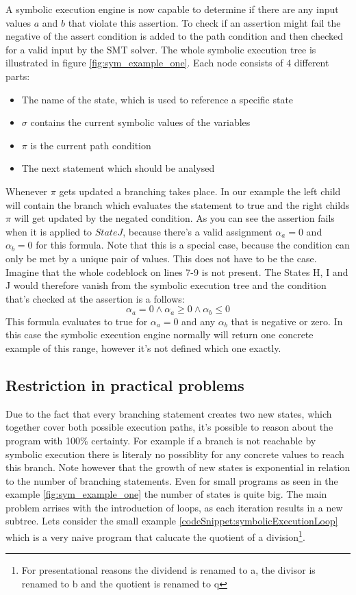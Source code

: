 A symbolic execution engine is now capable to determine if there are any input values $a$  and $b$ that violate this assertion. To check if an assertion might fail the negative of the assert condition is added to the path condition and then checked for a valid input by the SMT solver. The whole symbolic execution tree is illustrated in figure \ref{fig:sym_example_one}. Each node consists of 4 different parts:
\begin{itemize}
\item The name of the state, which is used to reference a specific state
\item $\sigma$ contains the current symbolic values of the variables
\item $\pi$ is the current path condition
\item The next statement which should be analysed
\end{itemize}
Whenever $\pi$ gets updated a branching takes place. In our example the left child will contain the branch which evaluates the statement to true and the right childs $\pi$ will get updated by the negated condition.
As you can see the assertion fails when it is applied to $State J$, because there's a valid assignment $\alpha_a = 0$ and $\alpha_b = 0$ for this formula. Note that this is a special case, because the condition can only be met by a unique pair of values. This does not have to be the case. Imagine that the whole codeblock on lines 7-9 is not present. The States H, I and J would therefore vanish from the symbolic execution tree and the condition that's checked at the assertion is a follows:
$$\alpha_a  = 0 \land \alpha_a \geq 0 \land \alpha_b \leq 0$$
This formula evaluates to true for $\alpha_a = 0$  and any $\alpha_b$ that is negative or zero. In this case the symbolic execution engine normally will return one concrete example of this range, however it's not defined which one exactly. 
\subsection{Restriction in practical problems}
Due to the fact that every branching statement creates two new states, which together cover both possible execution paths, it's possible to reason about the program with 100\% certainty. For example if a branch is not reachable by symbolic execution there is literaly no possiblity for any concrete values to reach this branch. Note however that the growth of new states is exponential in relation to the number of branching statements. Even for small programs as seen in the example \ref{fig:sym_example_one} the number of states is quite big. The main problem arrises with the introduction of loops, as each iteration results in a new subtree. Lets consider the small example \ref{codeSnippet:symbolicExecutionLoop} which is a very naive program that calucate the quotient of a division\footnote{For presentational reasons the dividend is renamed to a, the divisor is renamed to b and the quotient is renamed to q}.